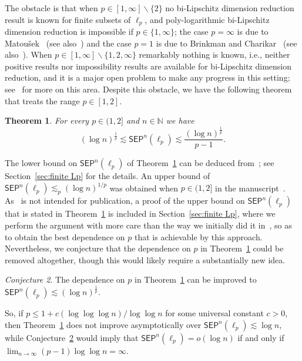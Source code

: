 \documentclass[11pt,reqno]{amsart}
\renewcommand{\le}{\leqslant}
\renewcommand{\setminus}{\smallsetminus}
\newtheorem{theorem}{Theorem}
\theoremstyle{remark}
\newtheorem{conjecture}[theorem]{Conjecture}
\newcommand{\N}{\mathbb N}
\renewcommand{\1}{\mathbf 1}
\newcommand{\sep}{\mathsf{SEP}}
\begin{document}
The obstacle is that when $p\in [1,\infty]\setminus \{2\}$ no bi-Lipschitz dimension reduction result is known for finite subsets of $\ell_p$, and poly-logarithmic bi-Lipschitz  dimension reduction  is impossible if $p\in \{1,\infty\}$; the case $p=\infty$ is due to Matou\v{s}ek~\cite{Mat96} (see also~\cite{Nao17,Nao21}) and the case $p=1$ is due to Brinkman and Charikar~\cite{BC05} (see also~\cite{LN04-diamond,Reg13,NPS20,NY21}). When $p\in [1,\infty]\setminus \{1,2,\infty\}$ remarkably nothing is known, i.e., neither positive results nor impossibility results are available for bi-Lipschitz  dimension reduction, and it is a major open problem to make any progress in this setting; see~\cite{Nao18} for more on this area. Despite this obstacle, we have the following theorem that treats  the range $p\in [1,2]$.
\begin{theorem}\label{eq:finite ellp}
For every $p\in (1,2]$ and $n\in \N$ we have $$(\log n)^{\frac{1}{p}}\lesssim\sep^n(\ell_p)\lesssim \frac{(\log n)^{\frac{1}{p}}}{p-1}.$$
\end{theorem}
The lower bound on $\sep^n(\ell_p)$ of Theorem~\ref{eq:finite ellp} can be deduced from~\cite{CCGGP98}; see Section~\ref{sec:finite Lp} for the details.  An upper bound of $\sep^n(\ell_p)\lesssim_p (\log n)^{1/p}$ was obtained when $p\in (1,2]$  in the manuscript~\cite{LN03}. As~\cite{LN03} is not intended for publication, a proof of the  upper bound on $\sep^n(\ell_p)$ that is stated in Theorem~\ref{eq:finite ellp} is included in Section~\ref{sec:finite Lp}, where we perform the argument with more care than the way we initially did it in~\cite{LN03}, so as to obtain the best dependence on $p$ that is achievable by this approach. Nevertheless, we conjecture that  the dependence on $p$ in Theorem~\ref{eq:finite ellp} could be removed altogether, though this would likely require a substantially new idea.
\begin{conjecture}\label{conj:endpoint}
The dependence on $p$ in  Theorem~\ref{eq:finite ellp} can be improved to $\sep^n(\ell_p)\lesssim (\log n)^{\frac{1}{p}}$.
\end{conjecture}
So, if $p\le 1+ c(\log\log \log n)/\log\log n$ for some universal constant $c>0$, then Theorem~\ref{eq:finite ellp} does not improve asymptotically over $\sep^n(\ell_p)\lesssim \log n$, while Conjecture~\ref{conj:endpoint} would imply that $\sep^n(\ell_p)=o(\log n)$ if and only if $\lim_{n\to\infty}(p-1)\log\log n=\infty$.
\end{document}
